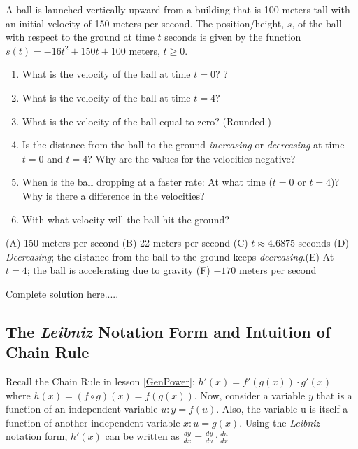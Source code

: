 \begin{example}
A ball is launched vertically upward from a building that is 100 meters tall with an initial velocity of 150 meters per second.  The position/height, $s$, of the ball with respect to the ground at time $t$ seconds is given by the function $s(t)=-16t^2+150t+100$ meters, $t\ge 0$.  
\renewcommand{\labelenumi}{(\Alph{enumi})}
\begin{enumerate}
    \item What is the velocity of the ball at time $t=0$? \vspace{0.5in}? 
    \item What is the velocity of the ball at time $t=4$?\vspace{0.5in}
    \item What is the velocity of the ball equal to zero? (Rounded.)\vspace{0.5in}
    \item Is the distance from the ball to the ground \emph{increasing} or \emph{decreasing} at time $t=0$ and $t=4$? Why are the values for the velocities negative?\vspace{0.6in}
    \item When is the ball dropping at a faster rate: At what time ($t=0$ or $t=4$)? Why is there a difference in the velocities? \vspace{0.5in}
    \item With what velocity will the ball hit the ground?\vspace{0.8in}
\end{enumerate}
    \begin{sol}
    (A) 150 meters per second (B) 22 meters per second (C) $t\approx 4.6875$ seconds (D) \emph{Decreasing}; the distance from the ball to the ground keeps \emph{decreasing}.(E) At $t=4$; the ball is accelerating due to gravity (F) $-170$ meters per second 
    \end{sol}
    \begin{solL}
    Complete solution here.....
    
    \end{solL}
    
\end{example}
\subsection*{The \emph{Leibniz} Notation Form and Intuition of Chain Rule}
Recall the Chain Rule in lesson \ref{GenPower}: $h'(x)=f'(g(x))\cdot g'(x)$ where $h(x)=(f\circ g)(x)=f(g(x))$. Now, consider a variable $y$ that is a function of an independent variable $u: y=f(u)$.  Also, the variable u is itself a function of another independent variable $x:  u=g(x)$. Using the \emph{Leibniz} notation form, $h'(x)$ can be written as $\displaystyle\frac{dy}{dx}=\frac{dy}{du}\cdot \frac{du}{dx}$\\

